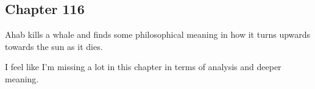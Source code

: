 \subsection{Chapter 116}

Ahab kills a whale and finds some philosophical meaning in how it turns upwards
towards the sun as it dies.

I feel like I'm missing a lot in this chapter in terms of analysis and deeper
meaning.
